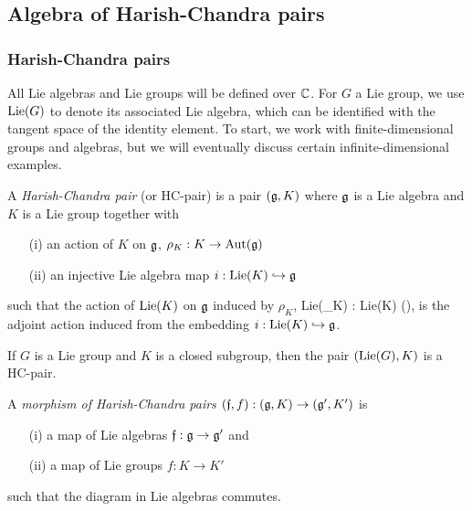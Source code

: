 \subsection{Algebra of Harish-Chandra pairs}

\subsubsection{Harish-Chandra pairs}
All Lie algebras and Lie groups will be defined over $\mathbb C$. For $G$ a Lie group, we use ${\rm Lie}(G)$ to denote its associated Lie algebra, which can be identified with the tangent space of the identity element. To start, we work with finite-dimensional groups and algebras, but we will eventually discuss certain infinite-dimensional examples.
 
\begin{dfn} A {\em Harish-Chandra pair} (or HC-pair) is a pair $(\mathfrak g, K)$ where $\mathfrak g$ is a Lie algebra and $K$ is a Lie group together with
\begin{itemize}
\item[(i)] an action of $K$ on $\mathfrak g$, $\rho_K : K \to {\rm Aut}(\mathfrak g)$
\item[(ii)] an injective Lie algebra map $i : {\rm Lie}(K) \hookrightarrow \mathfrak g$
\end{itemize}
such that the action of ${\rm Lie}(K)$ on $\mathfrak g$ induced by $\rho_K$,
\ben
{\rm Lie}(\rho_K) : {\rm Lie}(K) (\fg),
\een
is the adjoint action induced from the embedding $i: {\rm Lie}(K) \hookrightarrow \mathfrak g$.
\end{dfn}

\begin{ex} If $G$ is a Lie group and $K$ is a closed subgroup, then
  the pair $({\rm Lie}(G), K)$ is a HC-pair. 
\end{ex}

\begin{dfn} 
A {\em morphism of Harish-Chandra pairs} $(\mathfrak{f}, f) : (\mathfrak g, K) \to (\mathfrak g',K')$ is 
\begin{itemize}
\item[(i)] a map of Lie algebras $\mathfrak{f} : \mathfrak g \to \mathfrak g'$ and
\item[(ii)] a map of Lie groups $f : K \to K'$
\end{itemize}
such that the diagram in Lie algebras
\ben
{}
\een
commutes. 
\end{dfn}

